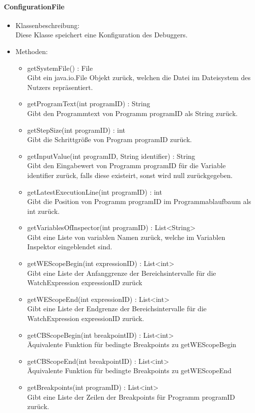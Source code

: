 \documentclass[parskip=full]{scrartcl}
\begin{document}
\paragraph{ConfigurationFile}
\begin{itemize}
\item Klassenbeschreibung: \\
Diese Klasse speichert eine Konfiguration des Debuggers.
\item Methoden: \\
\begin{itemize}
\item getSystemFile() : File \\
Gibt ein java.io.File Objekt zurück, welchen die Datei im Dateisystem des Nutzers repräsentiert.
\item getProgramText(int programID) : String \\
Gibt den Programmtext von Programm programID als String zurück.
\item getStepSize(int programID) : int \\
Gibt die Schrittgröße von Program programID zurück.
\item getInputValue(int programID, String identifier) : String \\
Gibt den Eingabewert von Programm programID für die Variable identifier zurück, falls diese existeirt,
sonst wird null zurückgegeben.
\item getLatestExecutionLine(int programID) : int \\
Gibt die Position von Programm programID im Programmablaufbaum als int zurück. %
\item getVariablesOfInspector(int programID) : List<String> \\
Gibt eine Liste von variablen Namen zurück, welche im Variablen Inspektor eingeblendet sind.
\item getWEScopeBegin(int expressionID) : List<int> \\
Gibt eine Liste der Anfanggrenze der Bereichsintervalle für die WatchExpression expressionID zurück
\item getWEScopeEnd(int expressionID) : List<int> \\
Gibt eine Liste der Endgrenze der Bereichsintervalle für die WatchExpression expressionID zurück.
\item getCBScopeBegin(int breakpointID) : List<int> \\
Äquivalente Funktion für bedingte Breakpoints zu getWEScopeBegin
\item getCBScopeEnd(int breakpointID) : List<int> \\
Äquivalente Funktion für bedingte Breakpoints zu getWEScopeEnd
\item getBreakpoints(int programID) : List<int> \\
Gibt eine Liste der Zeilen der Breakpoints für Programm programID zurück.
\end{itemize}
\end{itemize}
\end{document}
